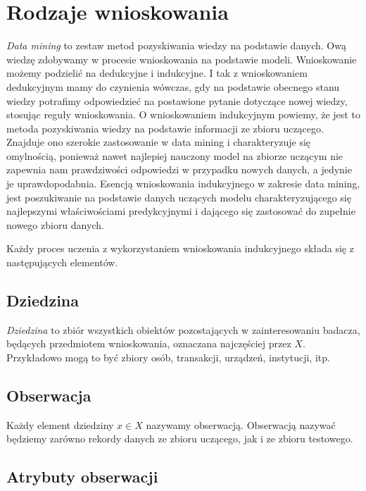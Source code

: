 \documentclass[
]{book}
\theoremstyle{plain}
\theoremstyle{definition}
\theoremstyle{definition}
\theoremstyle{definition}
\theoremstyle{definition}
\theoremstyle{definition}
\theoremstyle{remark}
\begin{document}
\section{Rodzaje wnioskowania}\label{rodzaje-wnioskowania}

\emph{Data mining} to zestaw metod pozyskiwania wiedzy na podstawie danych. Ową wiedzę zdobywamy w procesie wnioskowania na podstawie modeli. Wnioskowanie możemy podzielić na dedukcyjne i indukcyjne. I tak z wnioskowaniem dedukcyjnym mamy do czynienia wówczas, gdy na podstawie obecnego stanu wiedzy potrafimy odpowiedzieć na postawione pytanie dotyczące nowej wiedzy, stosując reguły wnioskowania. O wnioskowaniem indukcyjnym powiemy, że jest to metoda pozyskiwania wiedzy na podstawie informacji ze zbioru uczącego. Znajduje ono szerokie zastosowanie w data mining i charakteryzuje się omylnością, ponieważ nawet najlepiej nauczony model na zbiorze uczącym nie zapewnia nam prawdziwości odpowiedzi w przypadku nowych danych, a jedynie je uprawdopodabnia. Esencją wnioskowania indukcyjnego w zakresie data mining, jest poszukiwanie na podstawie danych uczących modelu charakteryzującego się najlepszymi właściwościami predykcyjnymi i dającego się zastosować do zupełnie nowego zbioru danych.

Każdy proces uczenia z wykorzystaniem wnioskowania indukcyjnego składa się z następujących elementów.

\subsection{Dziedzina}\label{dziedzina}

\emph{Dziedzina} to zbiór wszystkich obiektów pozostających w zainteresowaniu badacza, będących przedmiotem wnioskowania, oznaczana najczęściej przez \(X\). Przykładowo mogą to być zbiory osób, transakcji, urządzeń, instytucji, itp.

\subsection{Obserwacja}\label{obserwacja}

Każdy element dziedziny \(x\in X\) nazywamy obserwacją. Obserwacją nazywać będziemy zarówno rekordy danych ze zbioru uczącego, jak i ze zbioru testowego.

\subsection{Atrybuty obserwacji}\label{atrybuty-obserwacji}
\end{document}
